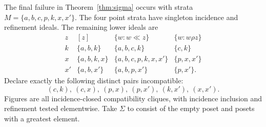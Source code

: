 \begin{counterexample}
\label{ex:sigma-seven}
The final failure in Theorem~\ref{thm:sigma} occurs with strata
$M=\{a,b,c,p,k,x,x'\}$. The four point strata have singleton
incidence and refinement ideals. The remaining lower ideals are
\[
\begin{array}{c|c|c|c}
 z &[z]&\{w:w\ll z\}&\{w:w\rho z\}\\\hline
 k&\{a,b,k\}&\{a,b,c,k\}&\{c,k\}\\
 x&\{a,b,k,x\}&\{a,b,c,p,k,x,x'\}&\{p,x,x'\}\\
 x'&\{a,b,x'\}&\{a,b,p,x'\}&\{p,x'\}.
\end{array}
\]
Declare exactly the following distinct pairs incompatible:
\[
 (c,k),\ (c,x),\ (p,x),\ (p,x'),\ (k,x'),\ (x,x').
\]
Figures are all incidence-closed compatibility cliques, with
incidence inclusion and refinement tested elementwise. Take
$\Sigma$ to consist of the empty poset and posets with a greatest
element.
\end{counterexample}
